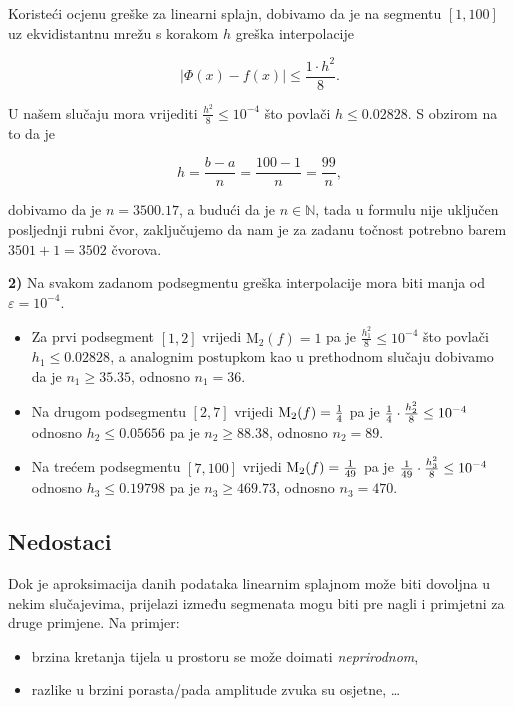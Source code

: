 Koristeći ocjenu greške za linearni splajn, dobivamo da je na segmentu $[1, 100]$
uz ekvidistantnu mrežu s korakom $h$ greška interpolacije

$$
|\Phi(x)-f(x)|\leq\frac{1\cdot h^2}{8}.
$$

U našem slučaju mora vrijediti $\displaystyle\frac{h^2}{8}\leq 10^{-4}$ što povlači $h\leq0.02828$.
S obzirom na to da je

$$
h=\frac{b-a}{n}=\frac{100-1}{n}=\frac{99}{n},
$$

dobivamo da je $n=3500.17$, a budući da je $n\in\mathbb{N}$, tada u formulu nije uključen posljednji rubni čvor, zaključujemo da nam je za zadanu točnost potrebno barem $3501+1=3502$ čvorova.

\bigskip

\textbf{2)} Na svakom zadanom podsegmentu greška interpolacije mora biti manja od $\varepsilon=10^{-4}$.

\begin{itemize}
    \item Za prvi podsegment $[1,2]$ vrijedi $\text{M}_2(f) = 1$ pa je $\frac{h_1^2}{8}\leq10^{-4}$ što povlači $h_1\leq0.02828$, a analognim postupkom kao u prethodnom slučaju dobivamo da je $n_1\geq35.35$, odnosno $n_1=36$.
    \item Na drugom podsegmentu $[2,7]$ vrijedi $\text{M}_2(f) = {1\over4}$ pa je ${1\over4}\cdot\frac{h_2^2}{8}\leq10^{-4}$ odnosno $h_2\leq0.05656$ pa je $n_2\geq88.38$, odnosno $n_2=89$.
    \item Na trećem podsegmentu $[7,100]$ vrijedi $\text{M}_2(f) = {1\over49}$ pa je ${1\over49}\cdot\frac{h_3^2}{8}\leq10^{-4}$ odnosno $h_3\leq0.19798$ pa je $n_3\geq469.73$, odnosno $n_3=470$.
\end{itemize}

\subsection{Nedostaci}

Dok je aproksimacija danih podataka linearnim splajnom može biti dovoljna u nekim slučajevima, prijelazi između segmenata mogu biti pre nagli i primjetni za druge primjene. Na primjer:

\begin{itemize}
    \item brzina kretanja tijela u prostoru se može doimati \textit{neprirodnom},
    \item razlike u brzini porasta/pada amplitude zvuka su osjetne, \dots
\end{itemize}
